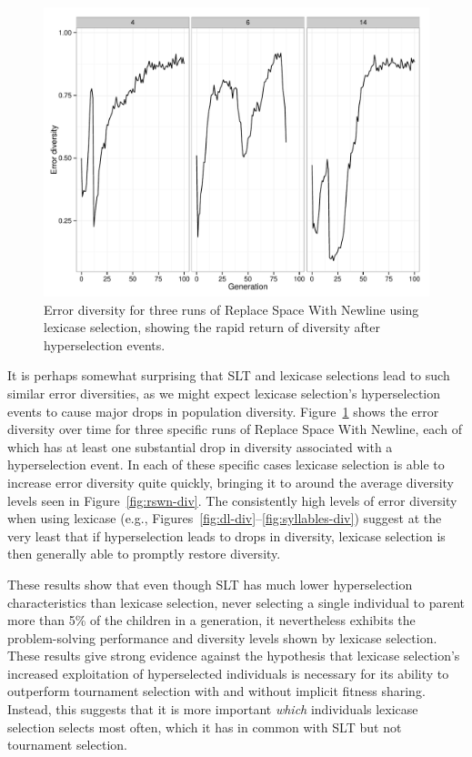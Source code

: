 \documentclass{sig-alternate}
\begin{document}
\begin{figure}[h]
	\centering
	\includegraphics[width=\linewidth]{lexicasebounceback.pdf}
	\caption{Error diversity for three runs of Replace Space With Newline using lexicase selection, showing the rapid return of diversity after hyperselection events.}
	\label{fig:rswnBounceback}
\end{figure}

It is perhaps somewhat surprising that SLT and lexicase selections lead to such similar error diversities, as we might expect lexicase selection's hyperselection events to cause major drops in population diversity. Figure~\ref{fig:rswnBounceback} shows the error diversity over time for three specific runs of Replace Space With Newline, each of which has at least one substantial drop in diversity associated with a hyperselection event. In each of these specific cases lexicase selection is able to increase error diversity quite quickly, bringing it to around the average diversity levels seen in Figure~\ref{fig:rswn-div}. The consistently high levels of error diversity when using lexicase (e.g., Figures~\ref{fig:dl-div}--\ref{fig:syllables-div}) suggest at the very least that if hyperselection leads to drops in diversity, lexicase selection is then generally able to promptly restore diversity.

These results show that even though SLT has much lower hyperselection characteristics than lexicase selection, never selecting a single individual to parent more than 5\% of the children in a generation, it nevertheless exhibits the problem-solving performance and diversity levels shown by lexicase selection. These results give strong evidence against the hypothesis that lexicase selection's increased exploitation of hyperselected individuals is necessary for its ability to outperform tournament selection with and without implicit fitness sharing. Instead, this suggests that it is more important \textit{which} individuals lexicase selection selects most often, which it has in common with SLT but not tournament selection.
\end{document}
